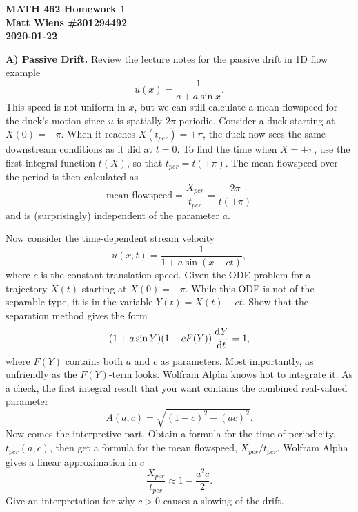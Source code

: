 \documentclass{article}
\begin{document}
\textbf{MATH 462 Homework 1} \\
\textbf{Matt Wiens \#301294492} \\
\textbf{2020-01-22}

\textbf{A) Passive Drift.} Review the lecture notes for the passive
drift in 1D flow example
%
\begin{equation*}
    u(x) = \frac{1}{a + a \sin x}
    .
\end{equation*}
%
This speed is not uniform in $x$, but we can still calculate a mean
flowspeed for the duck's motion since $u$ is spatially $2 \pi$-periodic.
Consider a duck starting at $X(0) = - \pi$. When it reaches $X(t_{per})
= + \pi$, the duck now sees the same downstream conditions as it did at
$t = 0$. To find the time when $X = + \pi$, use the first integral
function $t(X)$, so that $t_{per} = t(+\pi)$. The mean flowspeed over
the period is then calculated as
%
\begin{equation*}
    \text{mean flowspeed} = \frac{X_{per}}{t_{per}} = \frac{2 \pi}{t (+ \pi)}
\end{equation*}
%
and is (surprisingly) independent of the parameter $a$.

Now consider the time-dependent stream velocity
%
\begin{equation*}
    u(x, t) = \frac{1}{1 + a \sin (x - c t)}
    ,
\end{equation*}
%
where $c$ is the constant translation speed. Given the ODE problem for a
trajectory $X(t)$ starting at $X(0) = - \pi$. While this ODE is not of
the separable type, it is in the variable $Y(t) = X(t) - c t$. Show that
the separation method gives the form
%
\begin{equation*}
    (1 + a \sin Y) (1 - c F(Y)) \dod{Y}{t} = 1
    ,
\end{equation*}
%
where $F(Y)$ contains both $a$ and $c$ as parameters. Most importantly,
as unfriendly as the $F(Y)$-term looks. Wolfram Alpha knows hot to
integrate it. As a check, the first integral result that you want
contains the combined real-valued parameter
%
\begin{equation*}
    A(a, c) = \sqrt{(1 - c)^2 - (ac)^2}
    .
\end{equation*}
%
Now comes the interpretive part. Obtain a formula for the time of
periodicity, $t_{per}(a, c)$, then get a formula for the mean flowspeed,
$X_{per}/t_{per}$. Wolfram Alpha gives a linear approximation in $c$
%
\begin{equation*}
    \frac{X_{per}}{t_{per}} \approx 1 - \frac{a^2 c}{2}
    .
\end{equation*}
%
Give an interpretation for why $c > 0$ causes a slowing of the drift.
\end{document}
